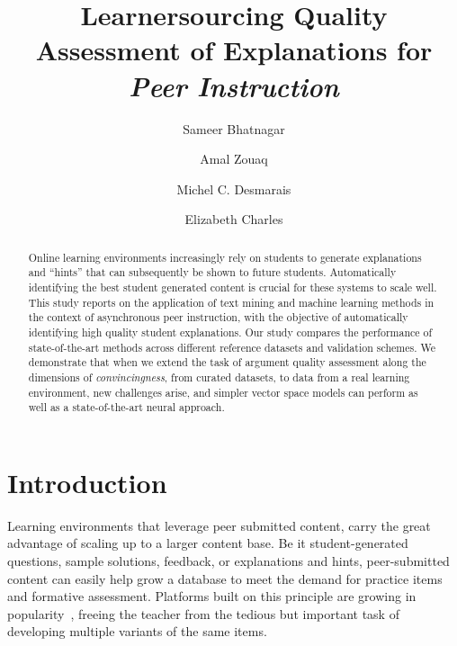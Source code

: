 \documentclass[runningheads]{llncs}
\begin{document}
%
\title{Learnersourcing Quality Assessment of Explanations for \textit{Peer 
Instruction}}
%
\author{Sameer Bhatnagar \and
Amal Zouaq \and
Michel C. Desmarais \and
Elizabeth Charles
}




%
\maketitle              %
%
\begin{abstract}
Online learning environments increasingly rely on students to generate 
explanations and ``hints'' that can subsequently be shown to future students. 
Automatically identifying the best student generated content is crucial for these systems to 
scale well. 
This study reports on the application of text mining and machine learning 
methods in the context of asynchronous peer instruction, with the objective of 
automatically identifying high quality student explanations. 
Our study compares the performance of state-of-the-art methods across different 
reference datasets and validation schemes.
We demonstrate that when we extend the task of argument quality assessment 
along the dimensions of \textit{convincingness}, from curated datasets, to data 
from a real learning environment, new challenges arise, and simpler vector 
space models can perform as well as a state-of-the-art neural approach. 

\end{abstract}


\section{Introduction}

Learning environments that leverage peer submitted content, carry the great 
advantage of scaling up to a larger content base.  
Be it student-generated questions, sample solutions, feedback, or explanations 
and hints, peer-submitted content can easily help grow a database to meet the 
demand for practice items and formative assessment.
Platforms built on this principle are growing in 
popularity~\cite{denny_effect_2013}\cite{khosravi_ripple_2019}, freeing the 
teacher from the tedious but important task of developing multiple variants of 
the same 
items. 
\end{document}
